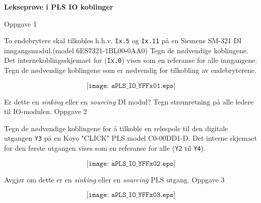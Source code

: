 

\centerline{\bf Lekseprøve i PLS IO koblinger}  \bigskip

Oppgave 1

To endebrytere skal tilkobles h.h.v. \texttt{Ix.5} og \texttt{Ix.11} på en Siemens SM-321 DI inngangsmodul.(model 6ES7321-1BL00-0AA0) Tegn de nødvendige koblingene. Det internekoblingsskjemaet for (\texttt{Ix.0}) vises som en referanse for alle inngangene.
Tegn de nødvendige koblingene som er nødvendig for tilkobling av endebryterene.  


$$\texttt{[image: aPLS\_IO\_YFFx01.eps]}$$

Er dette en \textit{sinking} eller en \textit{sourcing} DI modul?
Tegn strømretning på alle ledere til IO-modulen. 
\vfil
\eject 
Oppgave 2


Tegn de nødvendige koblingene for å tilkoble en relespole til den digitale utgangen \texttt{Y3} på en Koyo "CLICK" PLS model C0-00DD1-D. Det interne skjemaet for den første utgangen vises som en referanse for alle (\texttt{Y2} til \texttt{Y4}). 


$$\texttt{[image: aPLS\_IO\_YFFx02.eps]}$$

Avgjør om dette er en \textit{sinking} eller en \textit{sourcing} PLS utgang. 
\eject
Oppgave 3




\vskip 50pt

$$\texttt{[image: aPLS\_IO\_YFFx03.eps]}$$


